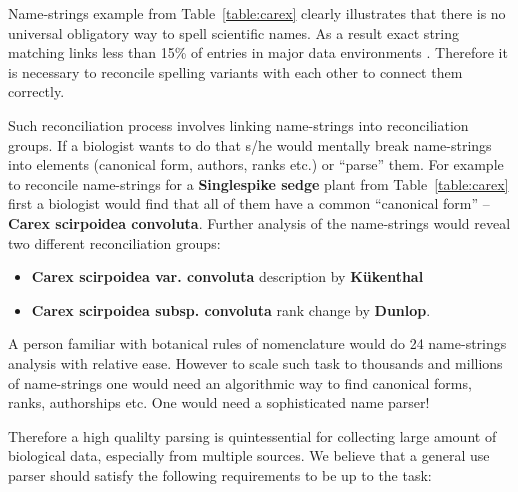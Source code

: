 \documentclass{bmcart}
\begin{document}
Name-strings example from Table~\ref{table:carex} clearly illustrates that
there is no universal obligatory way to spell scientific names. As a result
exact string matching links less than 15\% of entries in major data
environments \cite{Patterson:inpress-a}. Therefore it is necessary to reconcile
spelling variants with each other to connect them correctly.

Such reconciliation process involves linking name-strings into reconciliation
groups. If a biologist wants to do that s/he would mentally break name-strings
into elements (canonical form, authors, ranks etc.) or ``parse'' them. For
example to reconcile name-strings for a \textbf{Singlespike sedge} plant from
Table~\ref{table:carex} first a biologist would find that all of them have a
common ``canonical form'' -- \textbf{Carex scirpoidea convoluta}. Further
analysis of the name-strings would reveal two different reconciliation groups:

\begin{itemize}

  \item \textbf{Carex scirpoidea var. convoluta} description by
    \textbf{Kükenthal}

  \item \textbf{Carex scirpoidea subsp. convoluta} rank change by
    \textbf{Dunlop}.

\end{itemize}

A person familiar with botanical rules of nomenclature would do 24 name-strings
analysis with relative ease. However to scale such task to thousands and
millions of name-strings one would need an algorithmic way to find canonical
forms, ranks, authorships etc. One would need a sophisticated name parser!

Therefore a high qualilty parsing is quintessential for collecting large amount
of biological data, especially from multiple sources. We believe that a general
use parser should satisfy the following requirements to be up to the task:
\end{document}
